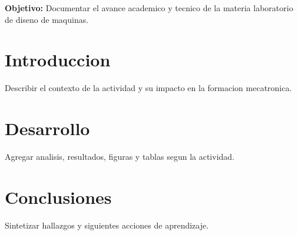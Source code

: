 \documentclass[spanish,letterpaper,oneside]{article}
\begin{document}
\templatePortrait
\templatePagecfg
\onehalfspacing

\begin{abstractd}
\textbf{Objetivo:} Documentar el avance academico y tecnico de la materia laboratorio de diseno de maquinas.
\end{abstractd}

\templateIndex
\templateFinalcfg

\section{Introduccion}
Describir el contexto de la actividad y su impacto en la formacion mecatronica.

\section{Desarrollo}
Agregar analisis, resultados, figuras y tablas segun la actividad.

\section{Conclusiones}
Sintetizar hallazgos y siguientes acciones de aprendizaje.



\end{document}
